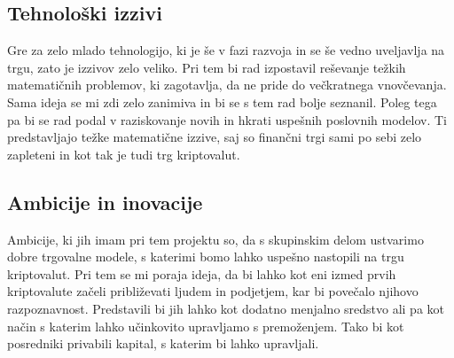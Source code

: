 \documentclass[10pt]{article}
\begin{document}
\subsection*{Tehnološki izzivi}
Gre za zelo mlado tehnologijo, ki je še v fazi razvoja in se še vedno uveljavlja na trgu, zato je izzivov zelo veliko. Pri tem bi rad izpostavil reševanje težkih matematičnih problemov, ki zagotavlja, da ne pride do večkratnega vnovčevanja. Sama ideja se mi zdi zelo zanimiva in bi se s tem rad bolje seznanil. Poleg tega pa bi se rad podal v raziskovanje novih in hkrati uspešnih poslovnih modelov. Ti predstavljajo težke matematične izzive, saj so finančni trgi sami po sebi zelo zapleteni in kot tak je tudi trg kriptovalut.

\subsection*{Ambicije in inovacije}
Ambicije, ki jih imam pri tem projektu so, da s skupinskim delom ustvarimo dobre trgovalne modele, s katerimi bomo lahko uspešno nastopili na trgu kriptovalut. Pri tem se mi poraja ideja, da bi lahko kot eni izmed prvih kriptovalute začeli približevati ljudem in podjetjem, kar bi povečalo njihovo razpoznavnost. Predstavili bi jih lahko kot dodatno menjalno sredstvo ali pa kot način s katerim lahko učinkovito upravljamo s premoženjem. Tako bi kot posredniki privabili kapital, s katerim bi lahko upravljali.
\end{document}
